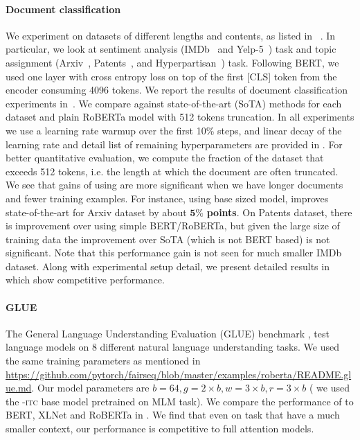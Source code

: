 \paragraph{Document classification}
We experiment on datasets of different lengths and contents,
as listed in ~.
In particular, we look at sentiment analysis (IMDb~\citep{maas2011learning} and Yelp-5~\citep{zhang2015character}) task and topic assignment (Arxiv~\citep{he2019long}, Patents~\citep{lee2020patent}, and Hyperpartisan~\citep{kiesel2019semeval}) task.
Following BERT, we used one layer with cross entropy loss on top of the first [CLS] token from the \bigb encoder consuming 4096 tokens.
We report the results of document classification experiments in~.
We compare against state-of-the-art (SoTA) methods for each dataset and plain RoBERTa model with 512 tokens truncation.
In all experiments we use a learning rate warmup over the first 10\% steps, and linear decay of the learning rate and detail list of remaining hyperparameters are provided in
.
For better quantitative evaluation, we compute the fraction of the dataset that exceeds 512 tokens, i.e. the length at which the document are often truncated.
We see that gains of using \bigb are more significant when we have longer documents and fewer training examples.
For instance, using base sized model,
\bigb improves state-of-the-art for Arxiv dataset by about $\bm{5\%}$ \textbf{points}.
On Patents dataset, there is improvement over using simple BERT/RoBERTa, but given the large size of training data the improvement over SoTA (which is not BERT based) is not significant.
Note that this performance gain is not seen for much
smaller IMDb dataset.
Along with experimental setup detail, we present detailed results in~ which show competitive performance.



\paragraph{GLUE}
The General Language Understanding Evaluation (GLUE) benchmark \citep{wang2018glue}, test language models on 8 different natural language understanding tasks.
We used the same training parameters as mentioned in \url{https://github.com/pytorch/fairseq/blob/master/examples/roberta/README.glue.md}. Our model parameters are $b=64, g=2\times b, w = 3 \times b, r = 3 \times b$ ( we used the \bigb-\textsc{itc} base model pretrained on MLM task). 
We compare the performance of \bigb to BERT, XLNet \citep{yang2019xlnet} and RoBERTa in . We find that even on task that have a much smaller context, our performance is competitive to full attention models.



